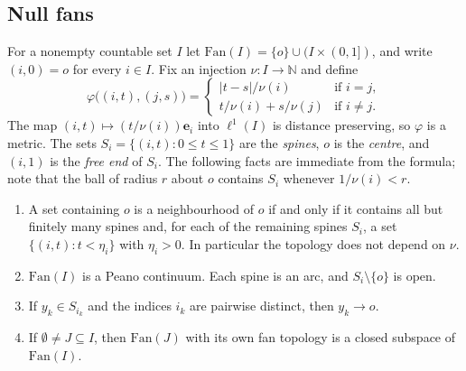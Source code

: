\documentclass[11pt]{amsart}
\theoremstyle{definition}
\theoremstyle{remark}
\newcommand{\N}{\mathbb{N}}
\numberwithin{equation}{section}
\begin{document}
\subsection{Null fans}
For a nonempty countable set $I$ let $\mathrm{Fan}(I)=\{o\}\cup(I\times(0,1])$, and write $(i,0)=o$ for every $i\in I$. Fix an injection $\nu\colon I\to\N$ and define
\[\varphi\bigl((i,t),(j,s)\bigr)=\begin{cases}|t-s|/\nu(i)&\text{if }i=j,\\ t/\nu(i)+s/\nu(j)&\text{if }i\ne j.\end{cases}\]
The map $(i,t)\mapsto(t/\nu(i))\mathbf e_i$ into $\ell^1(I)$ is distance preserving, so $\varphi$ is a metric. The sets $S_i=\{(i,t):0\le t\le1\}$ are the \emph{spines}, $o$ is the \emph{centre}, and $(i,1)$ is the \emph{free end} of $S_i$. The following facts are immediate from the formula; note that the ball of radius $r$ about $o$ contains $S_i$ whenever $1/\nu(i)<r$.
\begin{enumerate}[label=\textup{(F\arabic*)}]
\item A set containing $o$ is a neighbourhood of $o$ if and only if it contains all but finitely many spines and, for each of the remaining spines $S_i$, a set $\{(i,t):t<\eta_i\}$ with $\eta_i>0$. In particular the topology does not depend on $\nu$.
\item $\mathrm{Fan}(I)$ is a Peano continuum. Each spine is an arc, and $S_i\setminus\{o\}$ is open.
\item If $y_k\in S_{i_k}$ and the indices $i_k$ are pairwise distinct, then $y_k\to o$.
\item If $\emptyset\ne J\subseteq I$, then $\mathrm{Fan}(J)$ with its own fan topology is a closed subspace of $\mathrm{Fan}(I)$.
\end{enumerate}
\end{document}
